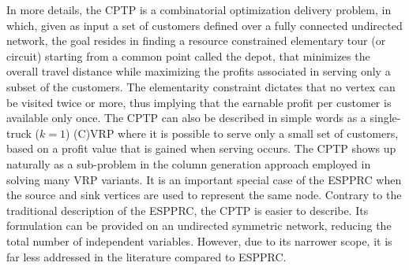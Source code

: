 In more details,
the CPTP is a combinatorial optimization delivery problem,
in which,
given as input a set of customers
defined over a fully connected undirected network, the goal resides in finding
a resource constrained elementary tour (or circuit) starting from a common point called the depot,
that minimizes the overall travel distance while maximizing
the profits associated in serving only a subset of the customers.
The elementarity constraint dictates that no vertex
can be visited twice or more, thus implying that the earnable profit
per customer is available only once.
The CPTP can also be described in simple words
as a single-truck ($k = 1$) (C)VRP where it is possible to serve only a small set of customers,
based on a profit value that is gained when serving occurs.
The CPTP shows up naturally as a sub-problem
in the column generation approach employed in solving many VRP variants.
It is an important special case of the
ESPPRC when the source and sink vertices are used to represent the same node.
Contrary to the traditional description of the ESPPRC,
the CPTP is easier to describe.
Its formulation can be provided on an undirected symmetric network,
reducing the total number of independent variables.
However, due to its narrower scope,
it is far less addressed in the literature compared to ESPPRC.


